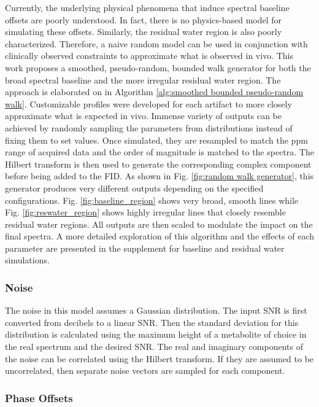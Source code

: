 Currently, the underlying physical phenomena that induce spectral baseline offsets are poorly understood. In fact, there is no physics-based model for simulating these offsets. Similarly, the residual water region is also poorly characterized. Therefore, a naive random model can be used in conjunction with clinically observed constraints to approximate what is observed in vivo. This work proposes a smoothed, pseudo-random, bounded walk generator for both the broad spectral baseline and the more irregular residual water region. The approach is elaborated on in Algorithm \ref{alg:smoothed bounded pseudo-random walk}. Customizable profiles were developed for each artifact to more closely approximate what is expected in vivo. Immense variety of outputs can be achieved by randomly sampling the parameters from distributions instead of fixing them to set values. Once simulated, they are resampled to match the ppm range of acquired data and the order of magnitude is matched to the spectra. The Hilbert transform is then used to generate the corresponding complex component before being added to the FID. As shown in Fig. \ref{fig:random walk generator}, this generator produces very different outputs depending on the specified configurations. Fig. \ref{fig:baseline_region} shows very broad, smooth lines while Fig. \ref{fig:reswater_region} shows highly irregular lines that closely resemble residual water regions. All outputs are then scaled to modulate the impact on the final spectra. A more detailed exploration of this algorithm and the effects of each parameter are presented in the supplement for baseline and residual water simulations.


 
\subsubsection{Noise}
The noise in this model assumes a Gaussian distribution. The input SNR is first converted from decibels to a linear SNR. Then the standard deviation for this distribution is calculated using the maximum height of a metabolite of choice in the real spectrum and the desired SNR. The real and imaginary components of the noise can be correlated using the Hilbert transform. If they are assumed to be uncorrelated, then separate noise vectors are sampled for each component. 

\subsubsection{Phase Offsets}
